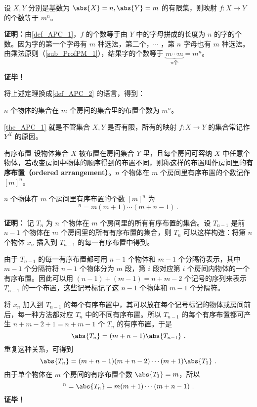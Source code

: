 \begin{theorem}{}\label{the_APC_1}
设 $X,Y$ 分别是基数为 $\abs{X}=n,\abs{Y}=m$ 的有限集，则映射 $f:X\rightarrow Y$ 的个数等于 $m^n$。
\end{theorem}
\textbf{证明：}由\autoref{def_APC_1}，$f$ 的个数等于由 $Y$ 中的字母拼成的长度为 $n$ 的字的个数。因为字的第一个字母有 $m$ 种选法，第二个，$\cdots$ ，第 $n$ 字母也有 $m$ 种选法。由乘法原则（\autoref{sub_ProfPM_1}），结果字的个数等于 $\underbrace{m\cdots m}_{n\text{个}}=m^n$。

\textbf{证毕！}

将上述定理换成\autoref{def_APC_2} 的语言，得到：
\begin{theorem}{}
$n$ 个物体的集合在 $m$ 个房间的集合里的布置个数为 $m^n$。
\end{theorem}

\autoref{the_APC_1} 就是不管集合 $X,Y$ 是否有限，所有的映射 $f:X\rightarrow Y$ 的集合常记作 $Y^X$ 的原因。

\begin{definition}{有序布置}
设物体集合 $X$ 被布置在房间集合 $Y$ 里，且每个房间可容纳 $X$ 中任意个物体，若改变房间中物体的顺序得到的布置不同，则称这样的布置叫作房间里的\textbf{有序布置（ordered arrangement）}。$n$ 个物体在 $m$ 个房间里有序布置的个数记作 $[m]^n$。
\end{definition}
\begin{theorem}{}
$n$ 个物体在 $m$ 个房间里有序布置的个数 $[m]^n$ 为
\begin{equation}
[m]^n=m(m+1)\cdots(m+n-1)~.
\end{equation}
\end{theorem}
\textbf{证明：}
记 $T_n$ 为 $n$ 个物体在 $m$ 个房间里的所有有序布置的集合。设 $T_{n-1}$ 是前 $n-1$ 个物体在 $m$ 个房间里的所有有序布置的集合，则 $T_n$ 可以这样构造：将第 $n$ 个物体 $x_n$ 插入到 $T_{n-1}$ 的每一有序布置中得到。

由于 $T_{n-1}$ 的每一有序布置都可用 $n-1$ 个物体和 $m-1$ 个分隔符表示，其中 $m-1$ 个分隔符将 $n-1$ 个物体分为 $m$ 段，第 $i$ 段对应第 $i$ 个房间内物体的一个有序布置。因此可以用 $(n-1)+(m-1)=n+m-2$ 个记号的序列来表示 $T_{n-1}$ 的一个布置，这些记号标记了这 $n-1$ 个物体和 $m-1$ 个分隔符。 

将 $x_n$ 加入到 $T_{n-1}$ 的每个有序布置中，其可以放在每个记号标记的物体或房间前后，每一种方法都对应 $T_{n}$ 中的不同有序布置。所以 $T_{n-1}$ 的每个有序布置都可产生 $n+m-2+1=n+m-1$ 个 $T_n$ 的有序布置。于是
\begin{equation}
\abs{T_n}=(m+n-1)\abs{T_{n-1}}~.
\end{equation}
重复这种关系，可得到
\begin{equation}
\abs{T_n}=(m+n-1)(m+n-2)\cdots (m+1)\abs{T_1}~.
\end{equation}
由于单个物体在 $m$ 个房间的有序布置个数 $\abs{T_1}=m$，所以
\begin{equation}
[m]^n=\abs{T_n}=m(m+1)\cdots(m+n-1)~.
\end{equation}
\textbf{证毕！}
